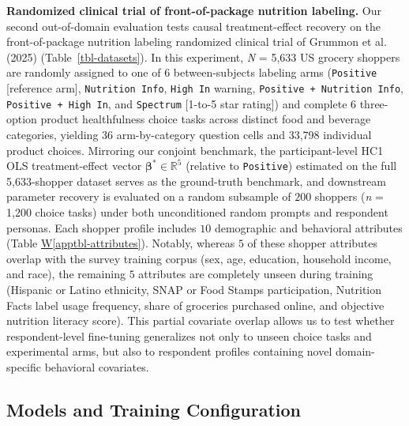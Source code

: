 \documentclass[
  letterpaper,
  DIV=11,
  numbers=noendperiod]{scrartcl}
\newcommand*\quartoapptblref[1]{Table \hyperref[#1]{W\ref{#1}}}
\begin{document}
\textbf{Randomized clinical trial of front-of-package nutrition
labeling.} Our second out-of-domain evaluation tests causal
treatment-effect recovery on the front-of-package nutrition labeling
randomized clinical trial of Grummon et al. (2025)
(Table~\ref{tbl-datasets}). In this experiment, \emph{N} = 5,633 US
grocery shoppers are randomly assigned to one of \(6\) between-subjects
labeling arms (\texttt{Positive} {[}reference arm{]},
\texttt{Nutrition\ Info}, \texttt{High\ In} warning,
\texttt{Positive\ +\ Nutrition\ Info}, \texttt{Positive\ +\ High\ In},
and \texttt{Spectrum} {[}1-to-5 star rating{]}) and complete \(6\)
three-option product healthfulness choice tasks across distinct food and
beverage categories, yielding \(36\) arm-by-category question cells and
33,798 individual product choices. Mirroring our conjoint benchmark, the
participant-level HC1 OLS treatment-effect vector
\(\boldsymbol{\beta}^* \in \mathbb{R}^5\) (relative to
\texttt{Positive}) estimated on the full 5,633-shopper dataset serves as
the ground-truth benchmark, and downstream parameter recovery is
evaluated on a random subsample of \(200\) shoppers (\emph{n} = 1,200
choice tasks) under both unconditioned random prompts and respondent
personas. Each shopper profile includes \(10\) demographic and
behavioral attributes (\quartoapptblref{apptbl-attributes}). Notably,
whereas \(5\) of these shopper attributes overlap with the survey
training corpus (sex, age, education, household income, and race), the
remaining \(5\) attributes are completely unseen during training
(Hispanic or Latino ethnicity, SNAP or Food Stamps participation,
Nutrition Facts label usage frequency, share of groceries purchased
online, and objective nutrition literacy score). This partial covariate
overlap allows us to test whether respondent-level fine-tuning
generalizes not only to unseen choice tasks and experimental arms, but
also to respondent profiles containing novel domain-specific behavioral
covariates.

\subsection{Models and Training
Configuration}\label{models-and-training-configuration}
\end{document}
